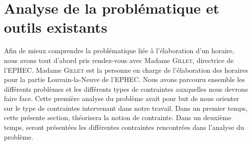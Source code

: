 
\chapter{Analyse de la problématique et outils existants}


Afin de mieux comprendre la problématique liée à l'élaboration d'un horaire, nous avons tout d'abord pris rendez-vous avec Madame \textsc{Gillet}, directrice de l'EPHEC. Madame \textsc{Gillet} est la personne en charge de l'élaboration des horaires pour la partie Louvain-la-Neuve de l'EPHEC. Nous avons parcouru ensemble les différents problèmes et les différents types de contraintes auxquelles nous devrons faire face. Cette première analyse du problème avait pour but de nous orienter sur le type de contraintes intervenant dans notre travail.
\newline
\indent
Dans un premier temps, cette présente section, théorisera la notion de contrainte. Dans un deuxième temps, seront présentées les différentes contraintes rencontrées dans l'analyse du problème. 


